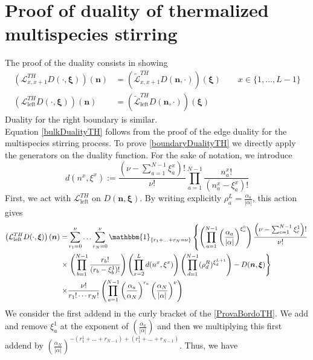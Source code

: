 \documentclass[10pt]{article}
\numberwithin{equation}{section}
\numberwithin{equation}{subsection}
\begin{document}
\section{Proof of duality of thermalized multispecies stirring}\label{appendix-dualityThermalized}
The proof of the duality consists in showing
\begin{align}
	\left(\mathcal{L}_{x,x+1}^{TH}D(\cdot,\bm{\xi})\right)(\bm{n})&=\left(\widetilde{\mathcal{L}}_{x,x+1}^{TH}D(\bm{n},\cdot)\right)(\bm{\xi})\qquad x\in \{1,\ldots,L-1\}\label{bulkDualityTH}\\
	\left(\mathcal{L}_{\text{left}}^{TH}D(\cdot,\bm{\xi})\right)(\bm{n})&=\left(\widetilde{\mathcal{L}}_{\text{left}}^{TH}D(\bm{n},\cdot)\right)(\bm{\xi})\label{boundaryDualityTH}
\end{align}
Duality for the right boundary is similar. \\
Equation \eqref{bulkDualityTH} follows from the proof of the edge duality for the multispecies stirring process. To prove \eqref{boundaryDualityTH} we directly apply the generators on the duality function. For the sake of notation, we introduce 
\begin{equation}
	d(n^{x},\xi^{x}):=\frac{(\nu-\sum_{a=1}^{N-1}\xi_{a}^{x})!}{\nu!}\prod_{a=1}^{N-1}\frac{n_{a}^{x}!}{(n_{a}^{x}-\xi_{a}^{x})!}
\end{equation}
First, we act with $\mathcal{L}_{\text{left}}^{TH}$ on $D(\bm{n},\bm{\xi})$. By writing explicitly $\rho_{a}^{L}=\frac{\alpha_{a}}{|\alpha|}$, this action gives
\begin{align}\label{ProvaBordoTH}
	\left(\mathcal{L}_{\text{left}}^{TH}D(\cdot,\bm{\xi})\right)(\bm{n})=\nonumber&\sum_{r_{1}=0}^{\nu}\ldots\sum_{r_{N}=0}^{\nu}\mathbbm{1}_{\{r_{1}+\ldots+r_{N}=\nu\}}\left\{\left(\prod_{a=1}^{N-1}\left(\frac{\alpha_{a}}{|\alpha|}\right)^{\xi_{a}^{0}}\right)\frac{\left(\nu-\sum_{c=1}^{N-1}\xi_{c}^{1}\right)!}{\nu!}\right.
	\\
	\times &\nonumber
	\left.\left(\prod_{b=1}^{N-1}\frac{r_{b}!}{(r_{b}-\xi^{1}_{b})!}\right)\left(\prod_{x=2}^{L}d(n^{x},\xi^{x})\right)\left(\prod_{d=1}^{N-1}(\rho_{d}^{R})^{\xi_{d}^{L+1}}\right)-D(\bm{n},\bm{\xi})\right\}
	\\\times &
	\frac{\nu!}{r_{1}!\cdots r_{N}!}\left(\prod_{a=1}^{N-1}\left(\frac{\alpha_{a}}{\alpha_{N}}\right)^{r_{a}}\left(\frac{\alpha_{N}}{|\alpha|}\right)^{\nu}\right)
\end{align}
We consider the first addend in the curly bracket of the \eqref{ProvaBordoTH}. We add and remove $\xi_{a}^{1}$ at the exponent of $\left(\frac{\alpha_{a}}{|\alpha|}\right)$ and then we multiplying this first addend by $\left(\frac{\alpha_{N}}{|\alpha|}\right)^{-(r_{1}^{1}+\ldots+r_{N-1})+(r_{1}^{1}+\ldots+r_{N-1})}$. Thus, we have
\end{document}

